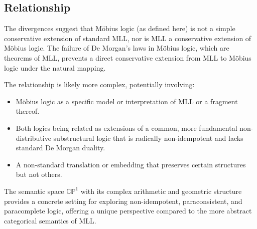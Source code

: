 	\subsection{Relationship}
	The divergences suggest that M\"{o}bius logic (as defined here) is not a simple conservative extension of standard MLL, nor is MLL a conservative extension of M\"{o}bius logic. The failure of De Morgan's laws in M\"{o}bius logic, which are theorems of MLL, prevents a direct conservative extension from MLL to M\"{o}bius logic under the natural mapping.
	
	The relationship is likely more complex, potentially involving:
	\begin{itemize}
		\item M\"{o}bius logic as a specific model or interpretation of MLL or a fragment thereof.
		\item Both logics being related as extensions of a common, more fundamental non-distributive substructural logic that is radically non-idempotent and lacks standard De Morgan duality.
		\item A non-standard translation or embedding that preserves certain structures but not others.
	\end{itemize}
	The semantic space \(\mathbb{CP}^1\) with its complex arithmetic and geometric structure provides a concrete setting for exploring non-idempotent, paraconsistent, and paracomplete logic, offering a unique perspective compared to the more abstract categorical semantics of MLL.
	
